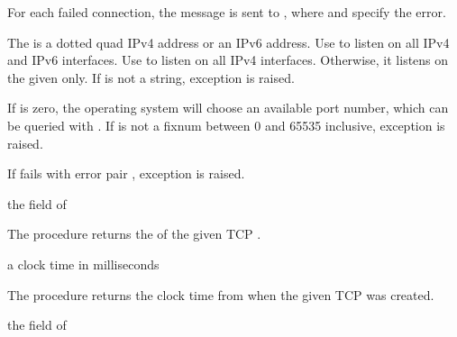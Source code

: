For each failed connection, the message  is sent to ,
where  and  specify the error.

The  is a dotted quad IPv4 address or an IPv6
address. Use  to listen on all IPv4 and IPv6 interfaces.
Use  to listen on all IPv4 interfaces. Otherwise, it
listens on the given  only. If  is not a
string, exception  is
raised.

If  is zero, the operating system will choose an
available port number, which can be queried with
. If  is not a fixnum
between 0 and 65535 inclusive, exception  is raised.

If  fails with error pair , exception  is raised.

\begin{procedure}
\end{procedure}
\returns{} the  field of 

The  procedure returns the  of
the given TCP .

\begin{procedure}
\end{procedure}
\returns{} a clock time in milliseconds

The  procedure returns the clock time from
 when the given TCP  was created.

\begin{procedure}
\end{procedure}
\returns{} the  field of 

